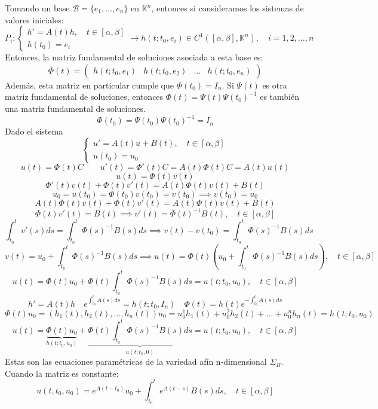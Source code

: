 Tomando un base $\mathcal{B} = \{e_1, \ldots, e_n\}$ en $\mathbb{K}^n$, entonces si consideramos los sistemas de valores iniciales:
\[
    P_i : \begin{cases}
        h' = A(t) h, \quad t \in [\alpha, \beta] \\
        h(t_0) = e_i
    \end{cases}
    \longrightarrow h(t; t_0, e_i) \in C^{1}([\alpha, \beta], \mathbb{K}^n), \quad i = 1, 2, \ldots, n
\]
Entonces, la matriz fundamental de soluciones asociada a esta base es:
\[
    \Phi(t) =
    \begin{pmatrix}
        h(t; t_0, e_1) & h(t; t_0, e_2) & \ldots & h(t; t_0, e_n)
    \end{pmatrix}
\]
Además, esta matriz en particular cumple que $\Phi(t_0) = I_n$. Si $\Psi(t)$ es otra matriz fundamental de soluciones, entonces $\Phi(t) = \Psi(t) \Psi(t_0)^{-1}$ es también una matriz fundamental de soluciones. 
\[
    \Phi(t_0) = \Psi(t_0) \Psi(t_0)^{-1} = I_n
\]
Dado el sistema
\[
    \begin{cases}
        u' = A(t) u + B(t), \quad t \in [\alpha, \beta] \\	
        u(t_0) = u_0
    \end{cases}
\]
\[
    u(t) = \Phi(t) C \qquad u'(t) = \Phi'(t) C = A(t) \Phi(t) C = A(t) u(t)
\] 
\[
    u(t) = \Phi(t) v(t)
\]
\[
    \Phi'(t) v(t) + \Phi(t) v'(t) = A(t) \Phi(t) v(t) + B(t)
\]
\[
    u_0 = u(t_0) = \Phi(t_0) v(t_0) = v(t_0) \implies v(t_0) = u_0
\]
\[
    A(t) \Phi(t) v(t) + \Phi(t) v'(t) = A(t) \Phi(t) v(t) + B(t) 
\]
\[
    \Phi(t) v'(t) = B(t) \implies v'(t) = \Phi(t)^{-1} B(t), \quad t \in [\alpha, \beta]
\]
\[
    \int_{t_0}^{t} v'(s) ds = \int_{t_0}^{t} \Phi(s)^{-1} B(s) ds \implies
    v(t) - v(t_0) = \int_{t_0}^{t} \Phi(s)^{-1} B(s) ds 
\]
\[
    v(t) = u_0 + \int_{t_0}^{t} \Phi(s)^{-1} B(s) ds \implies u(t) = \Phi(t) \left(u_0 + \int_{t_0}^{t} \Phi(s)^{-1} B(s) ds \right), \quad t \in [\alpha, \beta]
\]
\[
    u(t) = \Phi(t) u_0 + \Phi(t) \int_{t_0}^{t} \Phi(s)^{-1} B(s) ds = u(t; t_0, u_0), \quad t \in [\alpha, \beta]
\]
\[
    h' = A(t) h \quad e^{\int_{t_0}^{t} A(s) ds} = h(t; t_0, I_n) \quad \Phi(t) = h(t) e^{-\int_{t_0}^{t} A(s) ds}
\]
\[
    \Phi(t)u_0 = (h_1(t), h_2(t), \ldots, h_n(t)) u_0 = u_0^1 h_1(t) + u_0^2 h_2(t) + \ldots + u_0^n h_n(t) = h(t; t_0, u_0)
\]
\[
    u(t) = \underbrace{\Phi(t) u_0}_{h(t; t_0, u_0)} + \underbrace{\Phi(t) \int_{t_0}^{t} \Phi(s)^{-1} B(s) ds}_{u(t; t_0, 0)} = u(t; t_0, u_0), \quad t \in [\alpha, \beta]
\]
Estas son las ecuaciones paramétricas de la variedad afín n-dimensional $\Sigma_B$.
Cuando la matriz es constante:
\[
    u(t,t_0,u_0) = e^{A(t-t_0)} u_0 + \int_{t_0}^{t} e^{A(t-s)} B(s) ds, \quad t \in [\alpha, \beta]
\]


